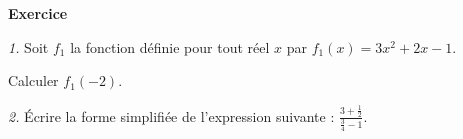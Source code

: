 \documentclass[12pt,french]{article}
\begin{document}
{\Large\bfseries Exercice}

\textit{1.} Soit $f_1$ la fonction définie pour tout réel $x$ par $f_1(x) = 3x^2 + 2x - 1$.\par Calculer $f_1(-2)$.\par
\textit{2.} \'Ecrire la forme simplifiée de l'expression suivante : $\frac{3 + \frac 1 2}{\frac 34 - 1}$.
\end{document}
